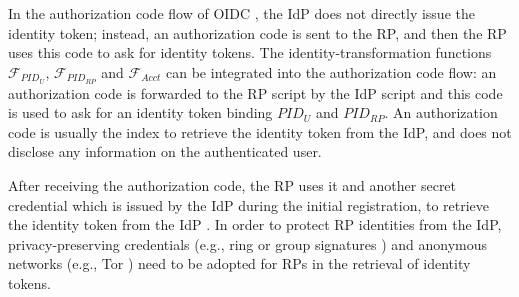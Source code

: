 


\vspace{0.5mm}
In the authorization code flow of OIDC \cite{OpenIDConnect},
    the IdP does not directly issue the identity token;
        instead,
            an authorization code is sent to the RP,
            and then the RP uses this code to ask for identity tokens.
The identity-transformation functions $\mathcal{F}_{PID_{U}}$, $\mathcal{F}_{PID_{RP}}$ and $\mathcal{F}_{Acct}$
    can be integrated into the authorization code flow:
            an authorization code is forwarded to the RP script by the IdP script
                and this code is used to ask for an identity token binding $PID_U$ and $PID_{RP}$.
An authorization code is usually the index to retrieve the identity token from the IdP,
        and does not disclose any information on the authenticated user.


After receiving the authorization code, the RP uses it and another secret credential
         which is issued by the IdP during the initial registration,
     to retrieve the identity token from the IdP \cite{OpenIDConnect}.
In order to protect RP identities from the IdP,
        privacy-preserving credentials (e.g., ring or group signatures \cite{ring-sig,chaum1991group})
        and anonymous networks (e.g., Tor \cite{tor}) need to be adopted for RPs in the retrieval of identity tokens.




